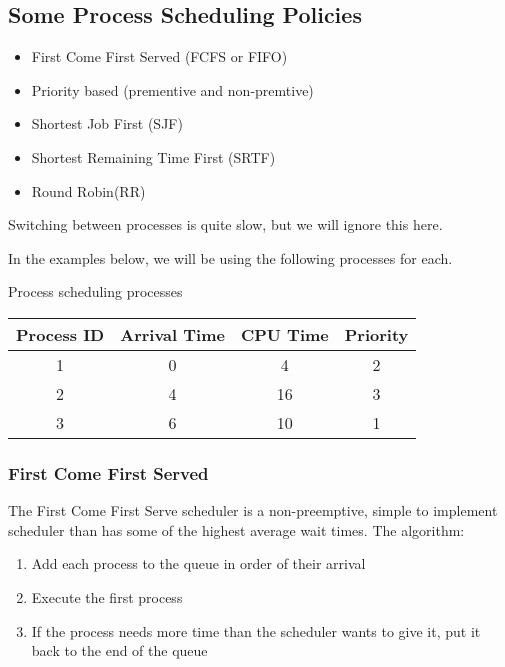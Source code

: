 \subsection{Some Process Scheduling Policies}\label{sub:some_process_scheduling_policies}

\begin{itemize}
	\item First Come First Served (FCFS or FIFO)
	\item Priority based (prementive and non-premtive)
	\item Shortest Job First (SJF)
	\item Shortest Remaining Time First (SRTF)
	\item Round Robin(RR)
\end{itemize}
%
\begin{note}
	Switching between processes is quite slow, but we will ignore this here.
\end{note}
%
In the examples below, we will be using the following processes for each.
\begin{highlight}{Process scheduling processes}
	\begin{tabular}{cccc}
		\toprule
		Process ID & Arrival Time & CPU Time & Priority \\
		\midrule
		1          & 0            & 4        & 2        \\
		2          & 4            & 16       & 3        \\
		3          & 6            & 10       & 1        \\
		\bottomrule
	\end{tabular}
\end{highlight}

\subsubsection{First Come First Served}\label{ssub:first_come_first_served}

The First Come First Serve scheduler is a non-preemptive, simple to implement scheduler than has some of the highest average wait times.
The algorithm:
\begin{enumerate}
	\item Add each process to the queue in order of their arrival
	\item Execute the first process
	\item If the process needs more time than the scheduler wants to give it, put it back to the end of the queue
\end{enumerate}

